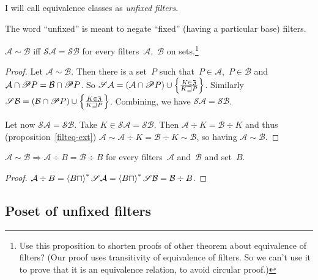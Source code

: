 \begin{defn}
I will call equivalence classes as
\emph{unfixed filters}.
\end{defn}

\begin{rem}
The word ``unfixed'' is meant to negate ``fixed'' (having
a particular base) filters.
\end{rem}

\begin{prop}\label{filteq-if-sim}
$\mathcal{A}\sim\mathcal{B}$ iff
$\mathscr{S}\mathcal{A}=\mathscr{S}\mathcal{B}$ for every
filters~$\mathcal{A}$,~$\mathcal{B}$ on sets.\footnote{Use this proposition to shorten proofs of other
theorem about equivalence of filters? (Our proof
uses transitivity of equivalence of filters. So we can't
use it to prove that it is an equivalence relation, to avoid circular proof.)}
\end{prop}

\begin{proof}
Let $\mathcal{A}\sim\mathcal{B}$. Then there is a set~$P$
such that~$P\in\mathcal{A}$,~$P\in\mathcal{B}$ and
$\mathcal{A}\cap\mathscr{P} P=\mathcal{B}\cap\mathscr{P} P$.
So $\mathscr{S}\mathcal{A} = (\mathcal{A}\cap\mathscr{P} P)\cup
\left\{ \frac{K\in\mathfrak{Z}}{K\sqsupseteq P}\right\}$.
Similarly
$\mathscr{S}\mathcal{B} = (\mathcal{B}\cap\mathscr{P} P)\cup
\left\{ \frac{K\in\mathfrak{Z}}{K\sqsupseteq P}\right\}$.
Combining, we have $\mathscr{S}\mathcal{A}=\mathscr{S}\mathcal{B}$.

Let now $\mathscr{S}\mathcal{A}=\mathscr{S}\mathcal{B}$.
Take $K\in\mathscr{S}\mathcal{A}=\mathscr{S}\mathcal{B}$.
Then $\mathcal{A}\div K=\mathcal{B}\div K$ and thus
(proposition~\ref{filteq-ext})
$\mathcal{A}\sim\mathcal{A}\div K =
\mathcal{B}\div K\sim\mathcal{B}$, so having
$\mathcal{A}\sim\mathcal{B}$.
\end{proof}

\begin{prop}\label{sim-rebase}
$\mathcal{A}\sim\mathcal{B} \Rightarrow
\mathcal{A}\div B=\mathcal{B}\div B$ for every
filters~$\mathcal{A}$ and~$\mathcal{B}$ and set~$B$.
\end{prop}

\begin{proof}
$\mathcal{A}\div B =
\left\langle B\sqcap\right\rangle ^{\ast}\mathscr{S}\mathcal{A} =
\left\langle B\sqcap\right\rangle ^{\ast}\mathscr{S}\mathcal{B} =
\mathcal{B}\div B$.
\end{proof}

\subsection{Poset of unfixed filters}


